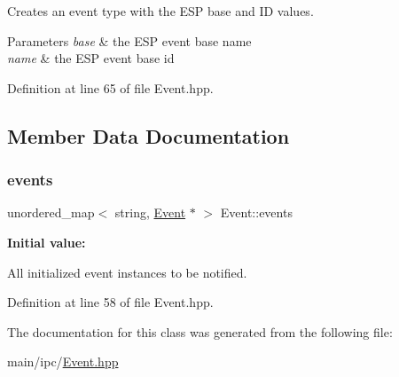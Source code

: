 Creates an event type with the E\+SP base and ID values.


\begin{DoxyParams}{Parameters}
{\em base} & the E\+SP event base name \\
\hline
{\em name} & the E\+SP event base id \\
\hline
\end{DoxyParams}


Definition at line 65 of file Event.\+hpp.


\begin{DoxyCode}{0}

\end{DoxyCode}


\subsection{Member Data Documentation}
\mbox{\label{classEvent_a00278e70937755acde8c5d749c035c29}} 
\subsubsection{\texorpdfstring{events}{events}}
{\footnotesize\ttfamily unordered\+\_\+map$<$ string, \mbox{\hyperlink{classEvent}{Event}} $\ast$ $>$ Event\+::events\hspace{0.3cm}{\ttfamily [static]}}

{\bfseries Initial value\+:}
\begin{DoxyCode}{0}
\DoxyCodeLine{>()}

\end{DoxyCode}
All initialized event instances to be notified. 

Definition at line 58 of file Event.\+hpp.



The documentation for this class was generated from the following file\+:\begin{DoxyCompactItemize}
\item 
main/ipc/\mbox{\hyperlink{Event_8hpp}{Event.\+hpp}}\end{DoxyCompactItemize}
